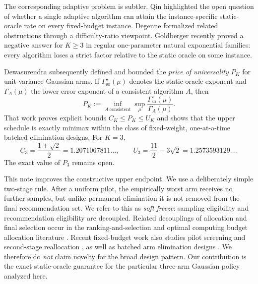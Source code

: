 \documentclass[11pt]{article}
\theoremstyle{definition}
\theoremstyle{remark}
\newcommand{\so}{\mathrm{so}}
\begin{document}
The corresponding adaptive problem is subtler. Qin \cite{qin2022} highlighted the open question of whether a single adaptive algorithm can attain the instance-specific static-oracle rate on every fixed-budget instance. Degenne \cite{degenne2023} formalized related obstructions through a difficulty-ratio viewpoint. Goldberger \cite{goldberger2026} recently proved a negative answer for $K\ge 3$ in regular one-parameter natural exponential families: every algorithm loses a strict factor relative to the static oracle on some instance.

Dewasurendra \cite{dewasurendra2026} subsequently defined and bounded the \emph{price of universality} $P_K$ for unit-variance Gaussian arms. If $\Gamma_{\so}^\star(\mu)$ denotes the static-oracle exponent and $\Gamma_A(\mu)$ the lower error exponent of a consistent algorithm $A$, then
\[
P_K:=\inf_{A\ \mathrm{consistent}}\sup_{\mu}\frac{\Gamma_{\so}^\star(\mu)}{\Gamma_A(\mu)}.
\]
That work proves explicit bounds $C_K\le P_K\le U_K$ and shows that the upper schedule is exactly minimax within the class of fixed-weight, one-at-a-time batched elimination designs. For $K=3$,
\begin{equation}
C_3=\frac{1+\sqrt2}{2}=1.2071067811\ldots,
\qquad
U_3=\frac{11}{2}-3\sqrt2=1.2573593129\ldots.
\label{eq:known-interval}
\end{equation}
The exact value of $P_3$ remains open.

This note improves the constructive upper endpoint. We use a deliberately simple two-stage rule. After a uniform pilot, the empirically worst arm receives no further samples, but unlike permanent elimination it is not removed from the final recommendation set. We refer to this as \emph{soft freeze}: sampling eligibility and recommendation eligibility are decoupled. Related decouplings of allocation and final selection occur in the ranking-and-selection and optimal computing budget allocation literature \cite{chen2000}. Recent fixed-budget work also studies pilot screening and second-stage reallocation \cite{kato2026}, as well as batched arm elimination designs \cite{imbens2025}. We therefore do \emph{not} claim novelty for the broad design pattern. Our contribution is the exact static-oracle guarantee for the particular three-arm Gaussian policy analyzed here.
\end{document}
